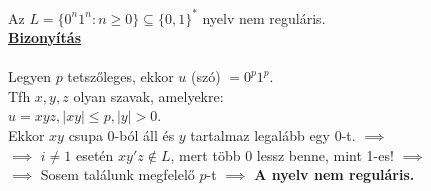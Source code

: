 \begin{frame}
\begin{tcolorbox}[title={Tétel: Példa nemreguláris nyelvre}]
Az $L = \{0^n1^n : n \geq 0\} \subseteq \{0, 1\}^*$ nyelv nem reguláris.\\
\tcblower
\msmallskip
\underline{\textbf{Bizonyítás}}\\
\mmedskip
\\
Legyen $p$  tetszőleges, ekkor $u$ (szó) $ = 0^p1^p$.\\
Tfh $x, y, z$ olyan szavak, amelyekre:\\
$u = xyz, |xy| \leq p, |y| > 0$.\\
\mbigskip
Ekkor $xy$ csupa 0-ból áll és $y$ tartalmaz legalább egy 0-t. $\implies$\\
$\implies$ $i \neq 1$ esetén $xy'z \notin L$, mert több 0 lessz benne, mint 1-es! $\implies$\\
$\implies$ Sosem találunk megfelelő $p$-t $\implies$ \textbf{A nyelv nem reguláris.}\\
\end{tcolorbox}

\end{frame}

